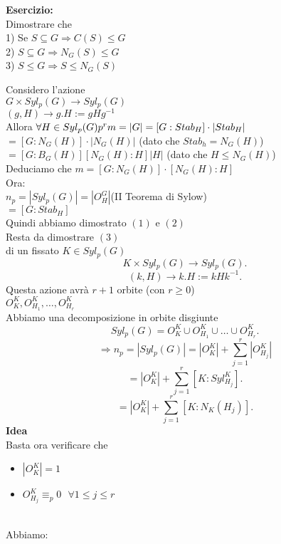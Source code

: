 \documentclass[12px]{article}
\begin{document}
	\textbf{Esercizio:}\\
	Dimostrare che\\
	1) Se $S\subseteq G \Rightarrow C(S) \leq G$ \\
	2) $S\subseteq G \Rightarrow N_G(S)\leq G$ \\
	3) $S\leq G \Rightarrow S\leq N_G(S)$ \\
	\begin{dimo}
		Considero l'azione\\
		$G\times Syl_p(G) \rightarrow Syl_p(G)$\\
		$(g,H) \rightarrow g.H := gHg^{-1}$ \\
		Allora $\forall H\in Syl_p(G)\\
		p^rm = |G| = [G:Stab_H]\cdot |Stab_H|$\\
		 $= [G:N_G(H)]\cdot |N_G(H)|$\hfill
		 (dato che $Stab_h = N_G(H)$)\\
		 $=[G:B_G(H)][N_G(H):H]|H|$\hfill
		 (dato che $H\leq N_G(H)$) \\
		 Deduciamo che $m = [G:N_G(H)]\cdot[N_G(H):H]$\\
		 Ora:\\
	 $n_p = |Syl_p(G)| = |O_H^G|$\hfill (II Teorema di Sylow)\\
	 $ = [G:Stab_H]$\\
	 Quindi abbiamo dimostrato $(1)$ e $(2)$\\
	 Resta da dimostrare $(3)$\\
	 di un fissato  $K\in Syl_p(G)$\\
	 \[
		 K\times Syl_p(G) \rightarrow Syl_p (G)
	 .\] 
	 \[
		 (k,H) \rightarrow k.H := kHk^{-1}
	 .\] 
	 Questa azione avrà $r + 1$ orbite (con $r \geq 0$)\\
	 $O_K^K, O_{H_1}^K,\ldots,O_{H_r}^K$\\
	 Abbiamo una decomposizione in orbite disgiunte
	 \[
		 Syl_p(G) = O_K^K\cup O_{H_1}^K\cup\ldots\cup O_{H_r}^K
	 .\] 
	 \[ \Rightarrow n_p = |Syl_p (G)| = |O_K^K| + \sum^r_{j=1}|O_{H_j}^K|\]
	 \[
		 =|O_K^K| + \sum^r_{j=1}[K:Syl_{H_j}^K]
	 .\] 
	 \[
		 = |O_K^K| + \sum^r_{j=1}[K:N_K(H_j)]
	 .\]
	 \textbf{Idea}\\
	 Basta ora verificare che
	 \begin{itemize}
		 \item $|O_K^K| = 1$
		 \item  $O_{H_j}^K\equiv_p 0 \ \ \ \forall 1\leq j\leq r$
	 \end{itemize}\\
	 Abbiamo:\\

\end{dimo}
\end{document}
